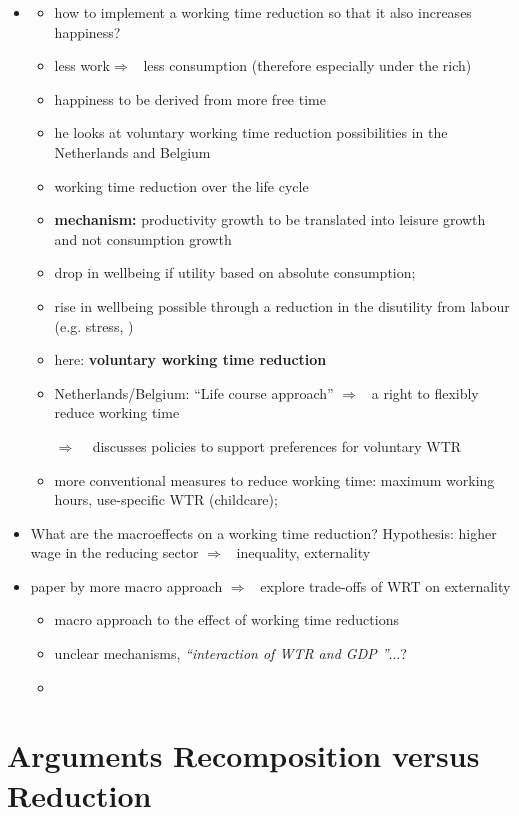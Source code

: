 \documentclass[12pt]{article}
\newcommand{\ar}{$\Rightarrow$ \ }
\begin{document}
\begin{itemize}
\item \cite{Pullinger2014WorkingDesign}
\begin{itemize}
\item how to implement a working time reduction so that it also increases happiness?
\item less work\ar less consumption (therefore especially under the rich)
\item happiness to be derived from more free time
\item he looks at voluntary working time reduction possibilities in the Netherlands and Belgium
\item working time reduction over the life cycle
\item \textbf{mechanism:} productivity growth to be translated into leisure growth and not consumption growth
\item drop in wellbeing if utility based on absolute consumption; 
\item rise in wellbeing possible through a reduction in the disutility from labour (e.g. stress, )
\item here: \textbf{voluntary working time reduction}
\item Netherlands/Belgium: ``Life course approach'' \ar a right to flexibly reduce working time
\item[\ar] discusses policies to support preferences for voluntary WTR
\item more conventional measures to reduce working time: 
maximum working hours, use-specific WTR (childcare); 
\end{itemize}
\item What are the macroeffects on a working time reduction? Hypothesis: higher wage in the reducing sector \ar inequality, externality
\item paper by \cite{Cieplinski2021EnvironmentalReductionb} more macro approach \ar explore trade-offs of WRT on externality
\begin{itemize}
\item macro approach to the effect of working time reductions
\item unclear mechanisms, \textit{``interaction of WTR and GDP ''}...?
\item 
\end{itemize}
\end{itemize}

\section{Arguments Recomposition versus Reduction}
\end{document}
